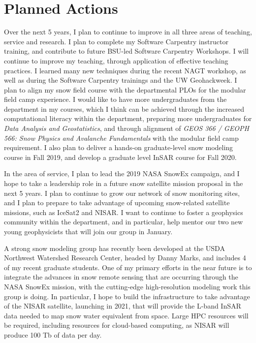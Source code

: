 \documentclass[11pt]{article}
\begin{document}
\section{Planned Actions}

Over the next 5 years, I plan to continue to improve in all three areas of teaching, service and research.  I plan to complete my Software Carpentry instructor training, and contribute to future BSU-led Software Carpentry Workshops.  I will continue to improve my teaching, through application of effective teaching practices. I learned many new techniques during the recent NAGT workshop, as well as during the Software Carpentry trainings and the UW Geohackweek.  I plan to align my snow field course with the departmental PLOs for the modular field camp experience.  I would like to have more undergraduates from the department in my courses, which I think can be achieved through the increased computational literacy within the department, preparing more undergraduates for \textit{Data Analysis and Geostatistics}, and through alignment of \textit{GEOS 366 / GEOPH 566: Snow Physics and Avalanche Fundamentals} with the modular field camp requirement.  I also plan to deliver a hands-on graduate-level snow modeling course in Fall 2019, and develop a graduate level InSAR course for Fall 2020.

In the area of service, I plan to lead the 2019 NASA SnowEx campaign, and I hope to take a leadership role in a future snow satellite mission proposal in the next 5 years.  I plan to continue to grow our network of snow monitoring sites, and I plan to prepare to take advantage of upcoming snow-related satellite missions, such as IceSat2 and NISAR.  I want to continue to foster a geophysics community within the department, and in particular, help mentor our two new young geophysicists that will join our group in January.  

A strong snow modeling group has recently been developed at the USDA Northwest Watershed Research Center, headed by Danny Marks, and includes 4 of my recent graduate students.  One of my primary efforts in the near future is to integrate the advances in snow remote sensing that are occurring through the NASA SnowEx mission, with the cutting-edge high-resolution modeling work this group is doing.  In particular, I hope to build the infrastructure to take advantage of the NISAR satellite, launching in 2021, that will provide the L-band InSAR data needed to map snow water equivalent from space.  Large HPC resources will be required, including resources for cloud-based computing, as NISAR will produce 100 Tb of data per day.
\end{document}
